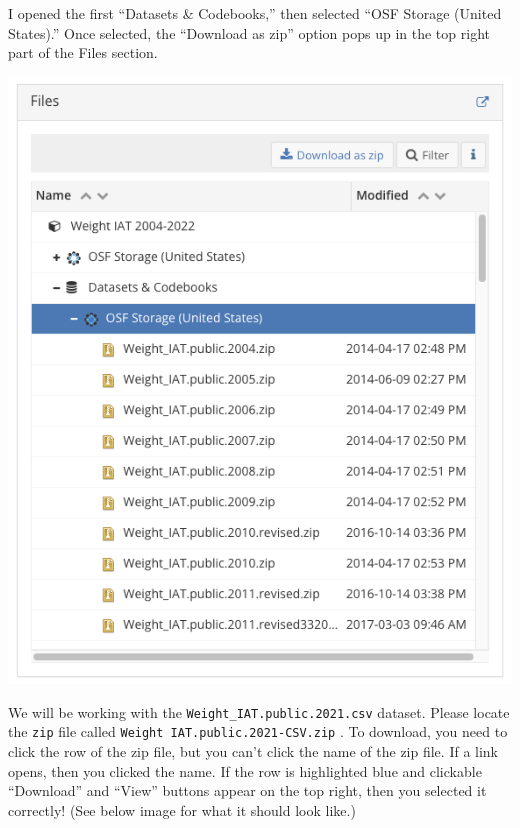 \documentclass[
  letterpaper,
  DIV=11,
  numbers=noendperiod]{scrartcl}
\begin{document}
I opened the first ``Datasets \& Codebooks,'' then selected ``OSF
Storage (United States).'' Once selected, the ``Download as zip'' option
pops up in the top right part of the Files section.

\includegraphics{images/data_access_2.png}

We will be working with the \texttt{Weight\_IAT.public.2021.csv}
dataset. Please locate the \texttt{zip} file called
\texttt{Weight\ IAT.public.2021-CSV.zip} . To download, you need to
click the row of the zip file, but you can't click the name of the zip
file. If a link opens, then you clicked the name. If the row is
highlighted blue and clickable ``Download'' and ``View'' buttons appear
on the top right, then you selected it correctly! (See below image for
what it should look like.)
\end{document}
